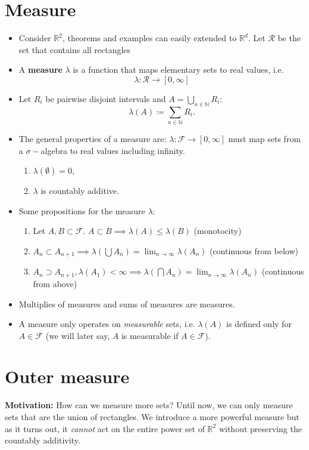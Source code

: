 \documentclass[a4paper, 11pt]{article}
\theoremstyle{plain}
\theoremstyle{definition}
\begin{document}
\section{Measure}
\begin{itemize}
	\item Consider $\mathbb R^2$, theorems and examples can easily extended to $\mathbb R^d$. Let $\mathcal R$ be the set that contains all rectangles
	\item A \textbf{measure} $\lambda$ is a function that maps elementary sets to real values, i.e. $$\lambda: \mathcal R \to [0,\infty]$$
	\item Let $R_i$ be pairwise disjoint intervals and $A = \bigcup_{n \in \mathbb N} R_i$:
	\[
		\lambda (A) \coloneqq \sum_{n \in \mathbb N}R_i.
	\]
	\item The general properties of a measure are: $\lambda: \mathcal F \to [0,\infty]$ must map sets from a $\sigma-$algebra to real values including infinity.
	\begin{enumerate}[label=(\arabic*)]
		\item $\lambda(\emptyset) = 0$,
		\item $\lambda$ is countably additive.
	\end{enumerate}

	\item Some propositions for the measure $\lambda$:
		\begin{enumerate}[label=(\arabic*)]
			\item Let $A,B \subset \mathcal F$. $A \subset B \implies \lambda(A) \leq \lambda (B)$ (monotocity)
			\item $A_n \subset A_{n+1} \implies \lambda(\bigcup A_n) = \lim_{n \to \infty}\lambda(A_n)$ (continuous from below)
			\item $A_n \supset A_{n+1}, \lambda(A_1) < \infty \implies \lambda(\bigcap A_n) = \lim_{n \to \infty}\lambda(A_n)$ (continuous from above)
		\end{enumerate}
		
	\item Multiplies of measures and sums of measures are measures.
	
	\item A measure only operates on \emph{measurable} sets, i.e. $\lambda(A)$ is defined only for $A \in \mathcal F$ (we will later say, $A$ is measurable if $A \in \mathcal F$).
\end{itemize}


\section{Outer measure}
\textbf{Motivation:} How can we measure more sets? Until now, we can only measure sets that are the union of rectangles. We introduce a more powerful measure but as it turns out, it \emph{cannot} act on the entire power set of $\mathbb R^2$ without preserving the countably additivity. \\
\end{document}
